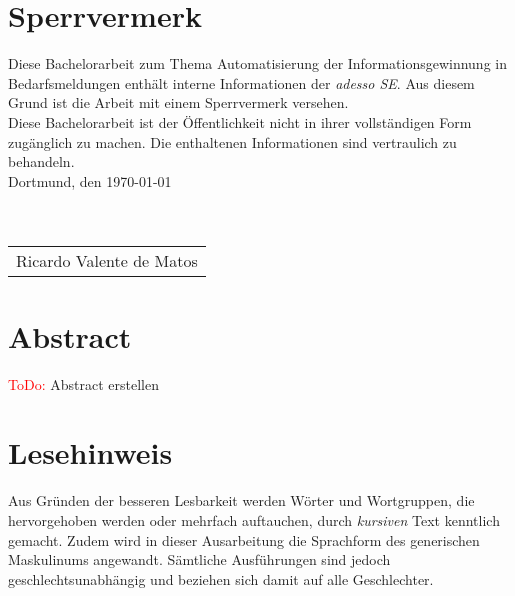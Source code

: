 \documentclass[a4paper,12pt]{scrreprt}
\newcommand{\todo}[1]{\textcolor{red}{ToDo:} #1\marginpar{<--hier}}
\begin{document}
\pagestyle{empty}




\pagestyle{fancy}
\chapter*{Sperrvermerk}
Diese Bachelorarbeit zum Thema \glqq Automatisierung der Informationsgewinnung in Bedarfsmeldungen\grqq{} enthält interne Informationen der \emph{adesso SE}. Aus diesem Grund ist die Arbeit mit einem Sperrvermerk versehen.\\

Diese Bachelorarbeit ist der Öffentlichkeit nicht in ihrer vollständigen Form zugänglich zu machen. Die enthaltenen Informationen sind vertraulich zu behandeln.\\

Dortmund, den \today \\ \\ \\
\begin{tabular}{@{}l@{}}\hline
	Ricardo Valente de Matos
\end{tabular}
\newpage
\chapter*{Abstract}
\todo{Abstract erstellen}
\newpage

\chapter*{Lesehinweis}
Aus Gründen der besseren Lesbarkeit werden Wörter und Wortgruppen, die hervorgehoben werden oder mehrfach auftauchen, durch \emph{kursiven} Text kenntlich gemacht. Zudem wird in dieser Ausarbeitung die Sprachform des generischen Maskulinums angewandt. Sämtliche Ausführungen sind jedoch geschlechtsunabhängig und beziehen sich damit auf alle Geschlechter.
\newpage
\tableofcontents
\listoffigures
\listoftables
\lstlistoflistings
\newpage

\setcounter{page}{1}
\pagestyle{fancy}
\setcounter{chapter}{0}
\newpage






\end{document}
